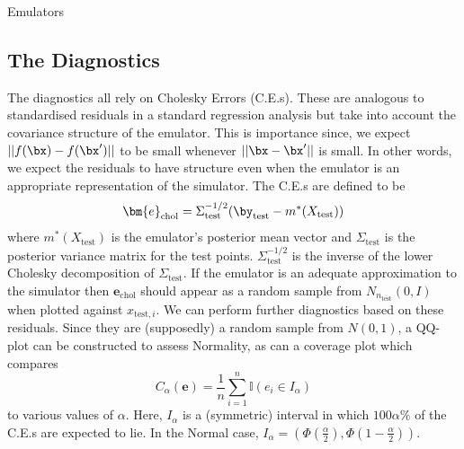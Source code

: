 \begin{chapter}{Emulators \label{Ch:Emulators}}
\subsection{The Diagnostics}
The diagnostics all rely on Cholesky Errors (C.E.s). These are analogous to standardised residuals in a standard regression analysis but take into account the covariance structure of the emulator. This is importance since, we expect $||f(\bx) - f(\bx')||$ to be small whenever $||\bx - \bx'||$ is small. In other words, we expect the residuals to have structure even when the emulator is an appropriate representation of the simulator. The C.E.s are defined to be
\begin{equation}
  \bm{e}_{\text{chol}} = \Sigma_\text{test}^{-1/2}(\by_{\text{test}} - m^{*}(X_{\text{test}}))
\end{equation}
where $m^*(X_{\text{test}})$ is the emulator's posterior mean vector and $\Sigma_\text{test}$ is the posterior variance matrix for the test points. $\Sigma^{-1/2}_\text{test}$ is the inverse of the lower Cholesky decomposition of $\Sigma_\text{test}$. If the emulator is an adequate approximation to the simulator then $\bm{e}_\text{chol}$ should appear as a random sample from $N_{n_\text{test}}(0, I)$ when plotted against $x_{\text{test},i}$. We can perform further diagnostics based on these residuals. Since they are (supposedly) a random sample from $N(0,1)$, a QQ-plot can be constructed to assess Normality, as can a coverage plot which compares
\begin{equation}
  C_\alpha (\bm{e}) = \frac{1}{n}\sum_{i=1}^n \mathbb{I} ( e_i \in I_{\alpha})
\end{equation}
to various values of $\alpha$. Here, $I_\alpha$ is a (symmetric) interval in which $100\alpha\%$ of the C.E.s are expected to lie. In the Normal case, $I_\alpha = \left( \Phi(\frac{\alpha}{2}), \Phi (1 - \frac{\alpha}{2}) \right)$.

\end{chapter}
